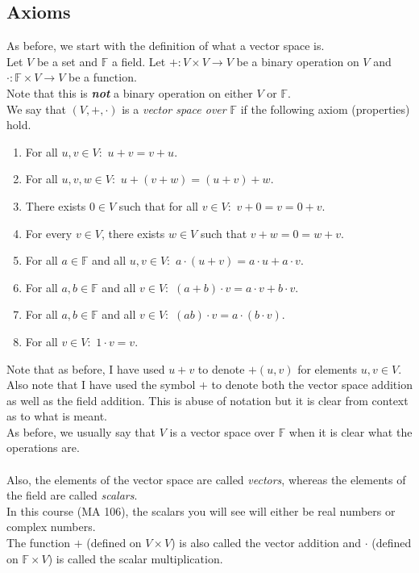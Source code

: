 \documentclass{article}
\begin{document}
\subsection{Axioms}
As before, we start with the definition of what a vector space is.\\
Let $V$ be a set and $\mathbb{F}$ a field. Let $+:V\times V\to V$ be a binary operation on $V$ and $\cdot:\mathbb{F}\times V\to V$ be a function.\\
Note that this is \emph{\textbf{not}} a binary operation on either $V$ or $\mathbb{F}.$\\
We say that $(V, +, \cdot)$ is a \emph{vector space over} $\mathbb{F}$ if the following axiom (properties) hold.
\begin{enumerate}[label = (A\arabic*)] 
	\item For all $u, v \in V:$ $u + v = v + u.$
	\item For all $u, v, w \in V:$ $u + (v + w) = (u + v) + w.$
	\item There exists $0 \in V$ such that for all $v \in V:$ $v + 0 = v = 0 + v.$
	\item For every $v \in V$, there exists $w \in V$ such that $v + w = 0 = w + v.$
	\item For all $a \in \mathbb{F}$ and all $u, v \in V:$ $a\cdot(u + v) = a\cdot u + a\cdot v.$
	\item For all $a, b \in \mathbb{F}$ and all $v \in V:$ $(a + b)\cdot v = a\cdot v + b\cdot v.$
	\item For all $a, b \in \mathbb{F}$ and all $v \in V:$ $(ab)\cdot v = a\cdot (b\cdot v).$
	\item For all $v \in V:$ $1\cdot v = v.$
\end{enumerate}
Note that as before, I have used $u + v$ to denote $+(u, v)$ for elements $u, v \in V.$\\
Also note that I have used the symbol $+$ to denote both the vector space addition as well as the field addition. This is abuse of notation but it is clear from context as to what is meant.\\
As before, we usually say that $V$ is a vector space over $\mathbb{F}$ when it is clear what the operations are.\\~\\
Also, the elements of the vector space are called \emph{vectors}, whereas the elements of the field are called \emph{scalars}.\\
In this course (MA 106), the scalars you will see will either be real numbers or complex numbers.\\
The function $+$ (defined on $V\times V$) is also called the vector addition and $\cdot$ (defined on $\mathbb{F}\times V$) is called the scalar multiplication.
\end{document}
